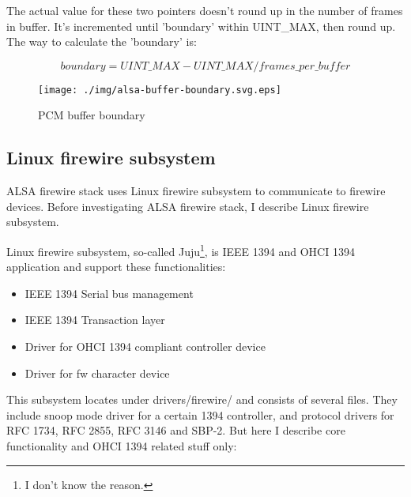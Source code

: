 \documentclass[onecolumn]{article}
\begin{document}
The actual value for these two pointers doesn't round up in the number of frames in buffer. It's incremented until 'boundary' within UINT\_MAX, then round up. The way to calculate the 'boundary' is:

\begin{equation}
boundary = UINT\_MAX - UINT\_MAX / frames\_per\_buffer 
\end{equation}

\begin{figure}[H]
	\centering
	\texttt{[image: ./img/alsa-buffer-boundary.svg.eps]}
	\caption{{PCM buffer boundary}}
	\label{alsa--buffer-boundary}
\end{figure}


\subsection{Linux firewire subsystem}

ALSA firewire stack uses Linux firewire subsystem to communicate to firewire devices. Before investigating ALSA firewire stack, I describe Linux firewire subsystem.

Linux firewire subsystem, so-called Juju\footnote{I don't know the reason.}, is IEEE 1394 and OHCI 1394 application and support these functionalities:

\begin{itemize}
\small
\item IEEE 1394 Serial bus management
\item IEEE 1394 Transaction layer
\item Driver for OHCI 1394 compliant controller device
\item Driver for fw character device
\end{itemize}

This subsystem locates under drivers/firewire/ and consists of several files. They include snoop mode driver for a certain 1394 controller, and protocol drivers for RFC 1734, RFC 2855, RFC 3146 and SBP-2. But here I describe core functionality and OHCI 1394 related stuff only:
\end{document}
